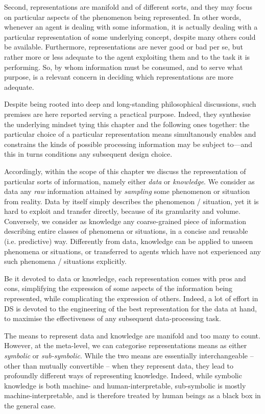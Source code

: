 \documentclass[12pt,a4paper,openright,twoside]{book}
\begin{document}
Second, representations are manifold and of different sorts, and they may focus on particular aspects of the phenomenon being represented.
% 
In other words, whenever an agent is dealing with some information, it is actually dealing with a particular representation of some underlying concept, despite many others could be available.
%
Furthermore, representations are never good or bad per se, but rather more or less adequate to the agent exploiting them and to the task it is performing.
%
So, by whom information must be consumed, and to serve what purpose, is a relevant concern in deciding which representations are more adequate.


%

Despite being rooted into deep and long-standing philosophical discussions, such premises are here reported serving a practical purpose.
%
Indeed, they synthesise the underlying mindset tying this chapter and the following ones together: the particular choice of a particular representation means simultanously enables and constrains the kinds of possible processing information may be subject to---and this in turns conditions any subsequent design choice. 

Accordingly, within the scope of this chapter we discuss the representation of particular sorts of information, namely either \emph{data} or \emph{knowledge}.
%
We consider as data any \emph{raw} information attained by \emph{sampling} some phenomenon or situation from reality.
%
Data by itself simply describes the phenomenon / situation, yet it is hard to exploit and transfer directly, because of its granularity and volume.
%
Conversely, we consider as knowledge any coarse-grained piece of information describing entire classes of phenomena or situations, in a concise and reusable (i.e. predictive) way.
%
Differently from data, knowledge can be applied to unseen phenomena or situations, or transferred to agents which have not experienced any such phenomena / situations explicitly.  

Be it devoted to data or knowledge, each representation comes with pros and cons, simplifying the expression of some aspects of the information being represented, while complicating the expression of others.
%
Indeed, a lot of effort in DS is devoted to the engineering of the best representation for the data at hand, to maximise the effectiveness of any subsequent data-processing task.

The means to represent data and knowledge are manifold and too many to count.
%
However, at the meta-level, we can categorise representations means as either \emph{symbolic} or \emph{sub-symbolic}.
%
While the two means are essentially interchangeable -- other than mutually convertible -- when they represent data, they lead to profoundly different ways of representing knowledge.
%
Indeed, while symbolic knowledge is both machine- and human-interpretable, sub-symbolic is mostly machine-interpretable, and is therefore treated by human beings as a black box in the general case. 
\end{document}
